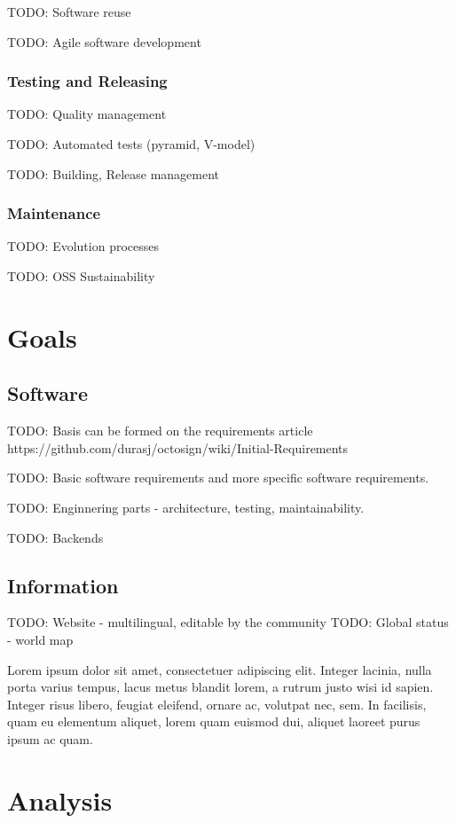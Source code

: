 \documentclass[thesismargins, english, thesislinespacing, twoside, openright, upjsfrontpage]{rnthesis}
\begin{document}
TODO: Software reuse

TODO: Agile software development

\subsection{Testing and Releasing}

TODO: Quality management

TODO: Automated tests (pyramid, V-model)

TODO: Building, Release management

\subsection{Maintenance}

TODO: Evolution processes

TODO: OSS Sustainability

\chapter{Goals}

\section{Software}

TODO: Basis can be formed on the requirements article https://github.com/durasj/octosign/wiki/Initial-Requirements

TODO: Basic software requirements and more specific software requirements.

TODO: Enginnering parts - architecture, testing, maintainability.

TODO: Backends

\section{Information}

TODO: Website - multilingual, editable by the community
TODO: Global status - world map

Lorem ipsum dolor sit amet, consectetuer adipiscing elit.
Integer lacinia, nulla porta varius tempus, lacus metus blandit
lorem, a rutrum justo wisi id sapien. Integer risus libero,
feugiat eleifend, ornare ac, volutpat nec, sem. In facilisis,
quam eu elementum aliquet, lorem quam euismod dui, aliquet
laoreet purus ipsum ac quam.

\chapter{Analysis}
\end{document}
